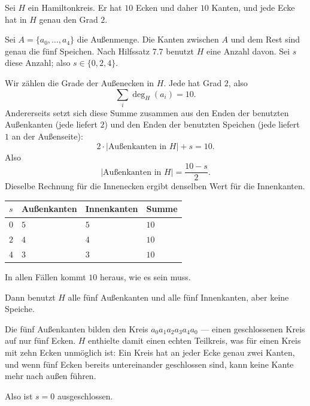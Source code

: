 \begin{merksatz}
Sei $H$ ein Hamiltonkreis. Er hat $10$ Ecken und daher $10$ Kanten, und jede Ecke hat in $H$ genau den Grad $2$.

Sei $A = \{a_0, \ldots, a_4\}$ die Außenmenge. Die Kanten zwischen $A$ und dem Rest sind genau die fünf Speichen. Nach Hilfssatz 7.7 benutzt $H$ eine  Anzahl davon. Sei $s$ diese Anzahl; also $s \in \{0, 2, 4\}$.

Wir zählen die Grade der Außenecken in $H$. Jede hat Grad $2$, also
\[ \sum_{i} \deg_H(a_i) = 10 . \]
Andererseits setzt sich diese Summe zusammen aus den Enden der benutzten Außenkanten (jede liefert $2$) und den Enden der benutzten Speichen (jede liefert $1$ an der Außenseite):
\[ 2 \cdot |{\text{Außenkanten in } H}| + s = 10 . \]
Also
\[ |{\text{Außenkanten in } H}| = \frac{10 - s}{2} . \]
Dieselbe Rechnung für die Innenecken ergibt denselben Wert für die Innenkanten.

\begin{center}
\renewcommand{\arraystretch}{1.45}
\begin{tabular}{@{}P{1.4cm}P{2.4cm}P{2.4cm}P{1.6cm}@{}}
\toprule
$s$ & \textbf{Außenkanten} & \textbf{Innenkanten} & \textbf{Summe}\\
\midrule
$0$ & $5$ & $5$ & $10$\\
$2$ & $4$ & $4$ & $10$\\
$4$ & $3$ & $3$ & $10$\\
\bottomrule
\end{tabular}
\end{center}
In allen Fällen kommt $10$ heraus, wie es sein muss.
\end{merksatz}

\begin{merksatz}
Dann benutzt $H$ alle fünf Außenkanten und alle fünf Innenkanten, aber keine Speiche.

Die fünf Außenkanten bilden den Kreis $a_0 a_1 a_2 a_3 a_4 a_0$ --- einen geschlossenen Kreis auf nur fünf Ecken. $H$ enthielte damit einen echten Teilkreis, was für einen Kreis mit zehn Ecken unmöglich ist: Ein Kreis hat an jeder Ecke genau zwei Kanten, und wenn fünf Ecken bereits untereinander geschlossen sind, kann keine Kante mehr nach außen führen.

Also ist $s = 0$ ausgeschlossen.
\end{merksatz}

